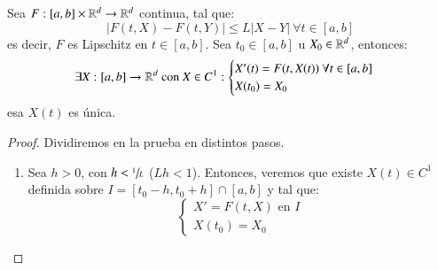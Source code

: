 \begin{thm}
    Sea $F: [a, b] \times \mathbb{R}^d \to \mathbb{R}^d$ continua, tal que:
    $$
        |F(t, X) - F(t, Y)| \leq L|X - Y|\ \forall t \in [a, b]
    $$
    es decir, $F$ es Lipschitz en $t\in[a, b]$. Sea $t_0 \in [a, b]$ u $X_0 \in \mathbb{R}^d$, entonces:
    $$
        \exists X:[a, b] \to \mathbb{R}^d \text{ con } X\in C^1 : \begin{cases}
            X'(t) = F(t, X(t))\ \forall t\in [a, b]\\
            X(t_0) = X_0
        \end{cases}
    $$ esa $X(t)$ es única.
\end{thm}
\begin{proof}
    Dividiremos en la prueba en distintos pasos.\\
    \begin{enumerate}
        \item \label{proof:primera-parte-unic} Sea $h>0$, con $h < \sfrac{1}{L}$ ($Lh < 1$). Entonces, veremos que existe $X(t) \in C^1$ definida sobre $I = [t_0-h, t_0+h]\cap[a, b]$ y tal que:
        $$
            \begin{cases}
                X' = F(t, X) \text{ en } I\\
                X(t_0) = X_0
            \end{cases}
        $$


\end{enumerate}
\end{proof}
